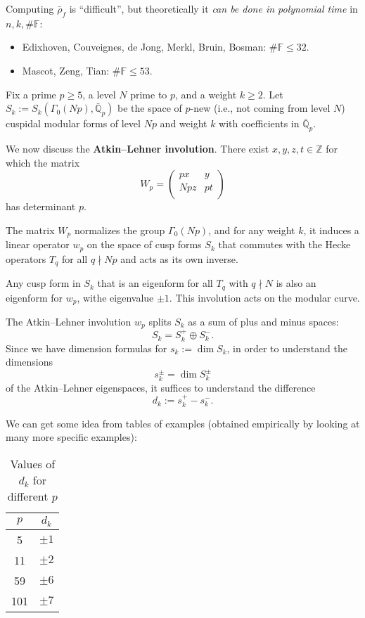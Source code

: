 \documentclass[reqno]{amsart} 
\begin{document}
Computing $\bar{\rho}_f$ is ``difficult'', but theoretically it \emph{can be done in polynomial time} in $n, k, \# \mathbb{F}$:
\begin{itemize}
\item Edixhoven, Couveignes, de Jong, Merkl, Bruin, Bosman: $\# \mathbb{F} \leq 32$.
\item Mascot, Zeng, Tian: $\# \mathbb{F} \leq 53$.
\end{itemize}

Fix a prime $p \geq 5$, a level $N$ prime to $p$, and a weight $k \geq 2$.  Let $S_k := S_k(\Gamma_0(N p), \bar{\mathbb{Q}}_p)$ be the space of $p$-new (i.e., not coming from level $N$) cuspidal modular forms of level $N p$ and weight $k$ with coefficients in $\bar{\mathbb{Q}}_p$.

We now discuss the \textbf{Atkin--Lehner involution}.  There exist $x, y, z, t \in \mathbb{Z}$ for which the matrix
\begin{equation*}
  W_p =
  \begin{pmatrix}
    p x    & y \\
    N p z &  p t \\
  \end{pmatrix}
\end{equation*}
has determinant $p$.

The matrix $W_p$ normalizes the group $\Gamma_0(N p)$, and for any weight $k$, it induces a linear operator $w_p$ on the space of cusp forms $S_k$ that commutes with the Hecke operators $T_q$ for all $q \nmid N p$ and acts as its own inverse.

Any cusp form in $S_k$ that is an eigenform for all $T_q$ with $q \nmid N$ is also an eigenform for $w_p$, withe eigenvalue $\pm 1$.  This involution acts on the modular curve.

The Atkin--Lehner involution $w_p$ splits $S_k$ as a sum of plus and minus spaces:
\begin{equation*}
  S_k = S_k^+ \oplus S_k^-.
\end{equation*}
Since we have dimension formulas for $s_k := \dim S_k$, in order to understand the dimensions
\begin{equation*}
  s_k^{\pm} = \dim S_k^{\pm}
\end{equation*}
of the Atkin--Lehner eigenspaces, it suffices to understand the difference
\begin{equation*}
  d_k := s_k^+ - s_k^-.
\end{equation*}

We can get some idea from tables of examples (obtained empirically by looking at many more specific examples):
\begin{table}[h]
  \centering
  \begin{tabular}{|c|c|}
    \hline
    $p$ & $d_k$ \\
    \hline
    5   & $\pm 1$ \\
    11  & $\pm 2$ \\
    59  & $\pm 6$ \\
    101 & $\pm 7$ \\
    \hline
  \end{tabular}
  \caption{Values of $d_k$ for different $p$}
  \label{tab:dk_values}
\end{table}
\end{document}
